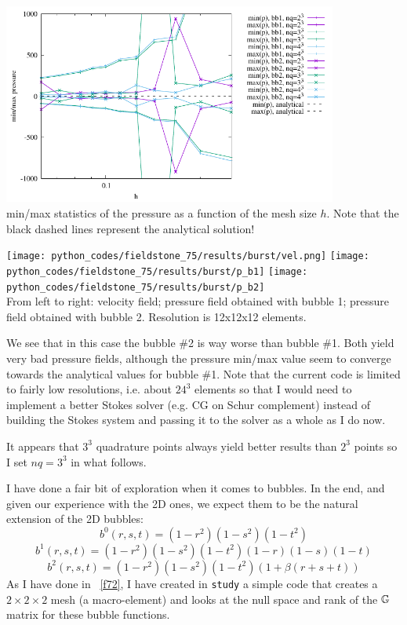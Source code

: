 \begin{center}
\includegraphics[width=11cm]{python_codes/fieldstone_75/results/burst/p_stats.pdf}\\
{\captionfont min/max statistics of the pressure as a function of the mesh size $h$. Note that 
the black dashed lines represent the analytical solution!}
\end{center}

\begin{center}
\texttt{[image: python\_codes/fieldstone\_75/results/burst/vel.png]}
\texttt{[image: python\_codes/fieldstone\_75/results/burst/p\_b1]}
\texttt{[image: python\_codes/fieldstone\_75/results/burst/p\_b2]}\\
{\captionfont From left to right: velocity field; pressure field obtained with bubble 1;
pressure field obtained with bubble 2. Resolution is 12x12x12 elements.}
\end{center}

We see that in this case the bubble \#2 is way worse than bubble \#1. Both 
yield very bad pressure fields, although the pressure min/max value seem to converge 
towards the analytical values for bubble \#1. 
Note that the current code is limited to fairly low resolutions, i.e. about $24^3$ elements so that
I would need to implement a better Stokes solver (e.g. CG on Schur complement) instead 
of building the Stokes system and passing it to the solver as a whole as I do now. %

It appears that $3^3$ quadrature points always yield better results than $2^3$ points
so I set $nq=3^3$ in what follows.

\newpage
I have done a fair bit of exploration when it comes to bubbles.
In the end, and given our experience with the 2D ones, we expect them  
to be the natural extension of the 2D bubbles:
\[
b^0(r,s,t) = (1-r^2)(1-s^2)(1-t^2)
\]
\[
b^1(r,s,t) = (1-r^2)(1-s^2)(1-t^2)(1-r)(1-s)(1-t) 
\]
\[
b^2(r,s,t) = (1-r^2)(1-s^2)(1-t^2) (1+\beta(r+s+t))
\]
As I have done in \stone~\ref{f72}, I have created in {\tt study}
a simple code that creates a $2\times 2 \times 2$ mesh (a macro-element)
and looks at the null space and rank of the ${\mathbb{G}}$ matrix 
for these bubble functions.

